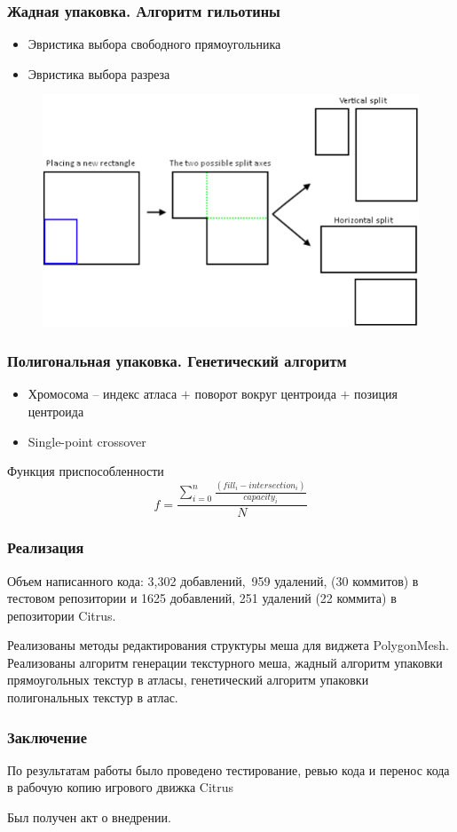 \documentclass[10pt, unicode]{beamer}
\begin{document}
    \begin{frame}
        \frametitle{Жадная упаковка. Алгоритм гильотины}
        \begin{itemize}
            \item Эвристика выбора свободного прямоугольника
            \item Эвристика выбора разреза
        \end{itemize}
        \begin{figure}[H]
            \centering
            \includegraphics[width=\linewidth, keepaspectratio]{Guillotine.png}
        \end{figure}
    \end{frame}
    \begin{frame}
        \frametitle{Полигональная упаковка. Генетический алгоритм}
        \begin{itemize}
            \item Хромосома -- индекс атласа $+$ поворот вокруг центроида $+$ позиция центроида
            \item Single-point crossover
        \end{itemize}
        
        Функция приспособленности
        \[
            f = \frac{\sum_{i=0}^n \frac{\left(fill_i - intersection_i\right)}{capacity_i}}{N}
        \]
    \end{frame}
    \begin{frame}
        \frametitle{Реализация}
        Объем написанного кода: 3,302 добавлений, 959 удалений, (30 коммитов) в тестовом репозитории и 1625 добавлений, 
        251 удалений (22 коммита) в репозитории Citrus.
        
        Реализованы методы редактирования структуры меша для виджета PolygonMesh.
        Реализованы алгоритм генерации текстурного меша, жадный алгоритм упаковки прямоугольных текстур в атласы, генетический 
        алгоритм упаковки полигональных текстур в атлас.  
    \end{frame}
    \begin{frame}
        \frametitle{Заключение}
        По результатам работы было проведено тестирование, ревью кода и перенос кода в рабочую копию игрового движка 
        Citrus

        Был получен акт о внедрении.
    \end{frame}
\end{document}
